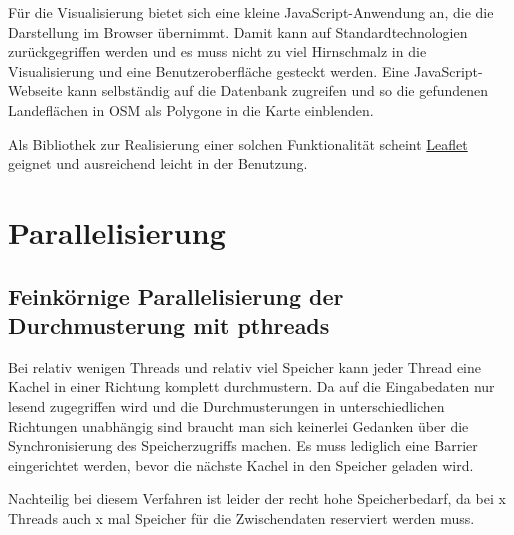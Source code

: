 \documentclass[
11pt, %
a4paper, %
oneside, %
pdfspacing, %
headinclude,
BCOR5mm, %
ngerman, %
bibtotocnumbered,
]{scrartcl}
\begin{document}
Für die Visualisierung bietet sich eine kleine JavaScript-Anwendung an, die die Darstellung im Browser übernimmt. Damit kann auf Standardtechnologien zurückgegriffen werden und es muss nicht zu viel Hirnschmalz in die Visualisierung und eine Benutzeroberfläche gesteckt werden. 
Eine JavaScript-Webseite kann selbständig auf die Datenbank zugreifen und so die gefundenen Landeflächen in OSM als Polygone in die Karte einblenden. 

Als Bibliothek zur Realisierung einer solchen Funktionalität scheint \href{http://leafletjs.com/examples.html }{Leaflet} geignet und ausreichend leicht in der Benutzung.





\section{Parallelisierung}

\subsection{Feinkörnige Parallelisierung der Durchmusterung mit pthreads}

Bei relativ wenigen Threads und relativ viel Speicher kann jeder Thread eine Kachel in einer Richtung komplett durchmustern. Da auf die Eingabedaten nur lesend zugegriffen wird und die Durchmusterungen in unterschiedlichen Richtungen unabhängig sind braucht man sich keinerlei Gedanken über die Synchronisierung des Speicherzugriffs machen. Es muss lediglich eine Barrier eingerichtet werden, bevor die nächste Kachel in den Speicher geladen wird.

Nachteilig bei diesem Verfahren ist leider der recht hohe Speicherbedarf, da bei x Threads auch x mal Speicher für die Zwischendaten reserviert werden muss.

\skippingparagraph
\end{document}
